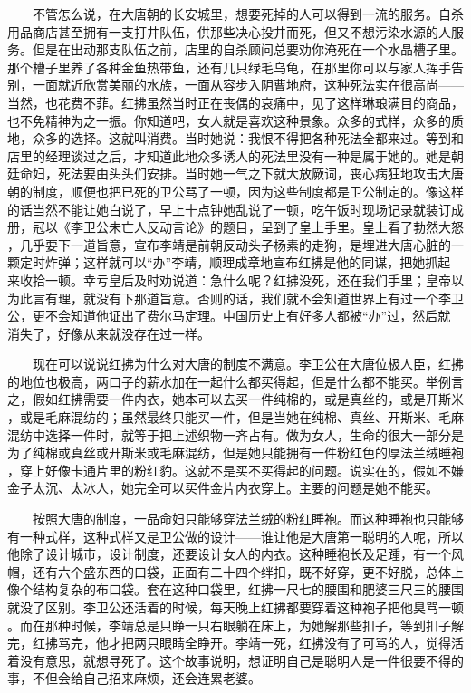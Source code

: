  　　不管怎么说，在大唐朝的长安城里，想要死掉的人可以得到一流的服务。自杀 用品商店甚至拥有一支打井队伍，供那些决心投井而死，但又不想污染水源的人服 务。但是在出动那支队伍之前，店里的自杀顾问总要劝你淹死在一个水晶槽子里。 那个槽子里养了各种金鱼热带鱼，还有几只绿毛乌龟，在那里你可以与家人挥手告 别，一面就近欣赏美丽的水族，一面从容步入阴曹地府，这种死法实在很高尚—— 当然，也花费不菲。红拂虽然当时正在丧偶的哀痛中，见了这样琳琅满目的商品， 也不免精神为之一振。你知道吧，女人就是喜欢这种景象。众多的式样，众多的质 地，众多的选择。这就叫消费。当时她说：我恨不得把各种死法全都来过。等到和 店里的经理谈过之后，才知道此地众多诱人的死法里没有一种是属于她的。她是朝 廷命妇，死法要由头头们安排。当时她一气之下就大放厥词，丧心病狂地攻击大唐 朝的制度，顺便也把已死的卫公骂了一顿，因为这些制度都是卫公制定的。像这样 的话当然不能让她白说了，早上十点钟她乱说了一顿，吃午饭时现场记录就装订成 册，冠以《李卫公未亡人反动言论》的题目，呈到了皇上手里。皇上看了勃然大怒 ，几乎要下一道旨意，宣布李靖是前朝反动头子杨素的走狗，是埋进大唐心脏的一 颗定时炸弹；这样就可以“办”李靖，顺理成章地宣布红拂是他的同谋，把她抓起 来收拾一顿。幸亏皇后及时劝说道：急什么呢？红拂没死，还在我们手里；皇帝以 为此言有理，就没有下那道旨意。否则的话，我们就不会知道世界上有过一个李卫 公，更不会知道他证出了费尔马定理。中国历史上有好多人都被“办”过，然后就 消失了，好像从来就没存在过一样。

 　　现在可以说说红拂为什么对大唐的制度不满意。李卫公在大唐位极人臣，红拂 的地位也极高，两口子的薪水加在一起什么都买得起，但是什么都不能买。举例言 之，假如红拂需要一件内衣，她本可以去买一件纯棉的，或是真丝的，或是开斯米 ，或是毛麻混纺的；虽然最终只能买一件，但是当她在纯棉、真丝、开斯米、毛麻 混纺中选择一件时，就等于把上述织物一齐占有。做为女人，生命的很大一部分是 为了纯棉或真丝或开斯米或毛麻混纺，但是她只能拥有一件粉红色的厚法兰绒睡袍 ，穿上好像卡通片里的粉红豹。这就不是买不买得起的问题。说实在的，假如不嫌 金子太沉、太冰人，她完全可以买件金片内衣穿上。主要的问题是她不能买。

 　　按照大唐的制度，一品命妇只能够穿法兰绒的粉红睡袍。而这种睡袍也只能够 有一种式样，这种式样又是卫公做的设计——谁让他是大唐第一聪明的人呢，所以 他除了设计城市，设计制度，还要设计女人的内衣。这种睡袍长及足踵，有一个风 帽，还有六个盛东西的口袋，正面有二十四个绊扣，既不好穿，更不好脱，总体上 像个结构复杂的布口袋。套在这种口袋里，红拂一尺七的腰围和肥婆三尺三的腰围 就没了区别。李卫公还活着的时候，每天晚上红拂都要穿着这种袍子把他臭骂一顿 。而在那种时候，李靖总是只睁一只右眼躺在床上，为她解那些扣子，等到扣子解 完，红拂骂完，他才把两只眼睛全睁开。李靖一死，红拂没有了可骂的人，觉得活 着没有意思，就想寻死了。这个故事说明，想证明自己是聪明人是一件很要不得的 事，不但会给自己招来麻烦，还会连累老婆。

